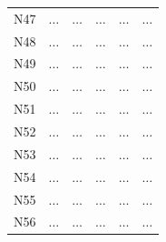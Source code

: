 \documentclass[12pt]{article}
\begin{document}
\begin{enumerate}
\begin{table}[h!]
\begin{tabular}{p{1in}p{1in}p{1in}p{1in}p{1in}p{1in}}
N47 & $\dots$ & $\dots$& $\dots$&$\dots$& $\dots$ \\
N48 & $\dots$ & $\dots$& $\dots$&$\dots$& $\dots$ \\
N49 & $\dots$ & $\dots$& $\dots$&$\dots$& $\dots$ \\
N50 & $\dots$ & $\dots$& $\dots$&$\dots$& $\dots$ \\
N51 & $\dots$ & $\dots$& $\dots$&$\dots$& $\dots$ \\
N52 & $\dots$ & $\dots$& $\dots$&$\dots$& $\dots$ \\
N53 & $\dots$ & $\dots$& $\dots$&$\dots$& $\dots$ \\
N54 & $\dots$ & $\dots$& $\dots$&$\dots$& $\dots$ \\
N55 & $\dots$ & $\dots$& $\dots$&$\dots$& $\dots$ \\
N56 & $\dots$ & $\dots$& $\dots$&$\dots$& $\dots$ \\
\hline
   \end{tabular}

   \label{tab:ByNodes}
\end{table}
\clearpage


\end{enumerate}
\end{document}
